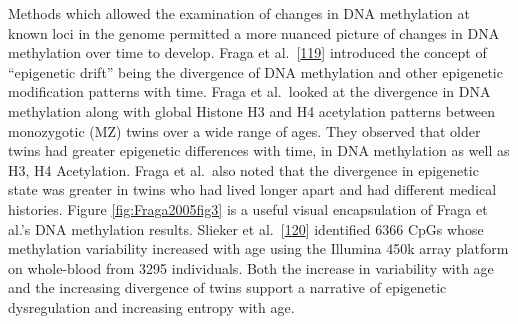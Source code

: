 \documentclass[
]{book}
\begin{document}
Methods which allowed the examination of changes in DNA methylation at known loci in the genome permitted a more nuanced picture of changes in DNA methylation over time to develop.
Fraga et al.~{[}\protect\hyperlink{ref-Fraga2005}{119}{]} introduced the concept of ``epigenetic drift'' being the divergence of DNA methylation and other epigenetic modification patterns with time.
Fraga et al.~looked at the divergence in DNA methylation along with global Histone H3 and H4 acetylation patterns between monozygotic (MZ) twins over a wide range of ages.
They observed that older twins had greater epigenetic differences with time, in DNA methylation as well as H3, H4 Acetylation.
Fraga et al.~also noted that the divergence in epigenetic state was greater in twins who had lived longer apart and had different medical histories.
Figure \ref{fig:Fraga2005fig3} is a useful visual encapsulation of Fraga et al.'s DNA methylation results.
Slieker et al.~{[}\protect\hyperlink{ref-Slieker2016}{120}{]} identified 6366 CpGs whose methylation variability increased with age using the Illumina 450k array platform on whole-blood from 3295 individuals.
Both the increase in variability with age and the increasing divergence of twins support a narrative of epigenetic dysregulation and increasing entropy with age.
\end{document}
